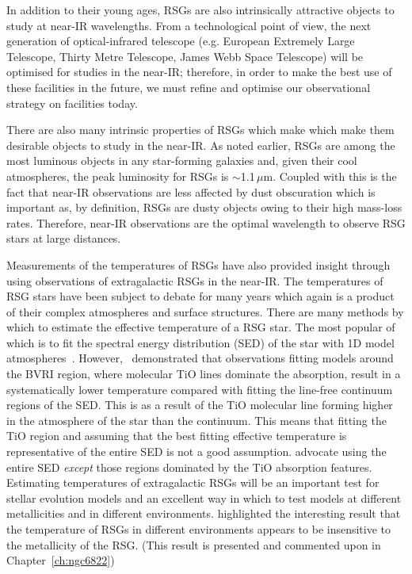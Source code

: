 In addition to their young ages, RSGs are also intrinsically attractive objects to study at near-IR wavelengths.
From a technological point of view, the next generation of optical-infrared telescope (e.g. European Extremely Large Telescope, Thirty Metre Telescope, James Webb Space Telescope) will be optimised for studies in the near-IR; therefore, in order to make the best use of these facilities in the future, we must refine and optimise our observational strategy on facilities today.

There are also many intrinsic properties of RSGs which make  which make them desirable objects to study in the near-IR.
As noted earlier, RSGs are among the most luminous objects in any star-forming galaxies and, given their cool atmospheres, the peak luminosity for RSGs is $\sim$1.1\,$\mu$m.
Coupled with this is the fact that near-IR observations are less affected by dust obscuration which is important as, by definition, RSGs are dusty objects owing to their high mass-loss rates.
Therefore, near-IR observations are the optimal wavelength to observe RSG stars at large distances.

Measurements of the temperatures of RSGs have also provided insight through using observations of extragalactic RSGs in the near-IR.
The temperatures of RSG stars have been subject to debate for many years which again is a product of their complex atmospheres and surface structures.
There are many methods by which to estimate the effective temperature of a RSG star.
The most popular of which is to fit the spectral energy distribution (SED) of the star with 1D model atmospheres~\citep{Levesque05,Levesque06}.
However,~\cite{2013ApJ...767....3D} demonstrated that observations fitting models around the BVRI region, where molecular TiO lines dominate the absorption, result in a systematically lower temperature compared with fitting the line-free continuum regions of the SED.
This is as a result of the TiO molecular line forming higher in the atmosphere of the star than the continuum.
This means that fitting the TiO region and assuming that the best fitting effective temperature is representative of the entire SED is not a good assumption.
\cite{2013ApJ...767....3D} advocate using the entire SED \textit{except} those regions dominated by the TiO absorption features.
Estimating temperatures of extragalactic RSGs will be an important test for stellar evolution models and an excellent way in which to test models at different metallicities and in different environments.
\cite{2015ApJ...803...14P} highlighted the interesting result that the temperature of RSGs in different environments appears to be insensitive to the metallicity of the RSG. (This result is presented and commented upon in Chapter~\ref{ch:ngc6822})

